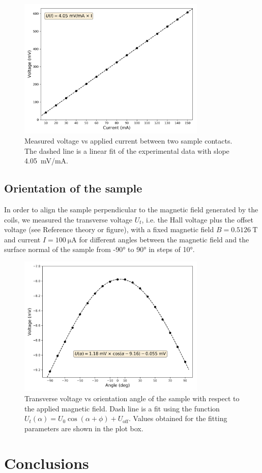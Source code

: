 \documentclass[11pt,a4paper]{article}
\begin{document}
\begin{figure}[ht]
\centering
\includegraphics[width=0.8\textwidth]{Voltage_vs_current_ohmic_test}
\caption{Measured voltage vs applied current between two sample contacts. The dashed line is a linear fit of the experimental data with slope \SI{4.05}{\milli\volt/\milli\ampere}.}
\label{fig:ohmic_check}
\end{figure}

\subsection{Orientation of the sample}

In order to align the sample perpendicular to the magnetic field generated by the coils, we measured the transverse voltage $U_t$, i.e. the Hall voltage plus the offset voltage (see {\color{red}Reference theory or figure}), with a fixed magnetic field $B=\SI{0.5126}{\tesla}$ and current $I=\SI{100}{\micro\ampere}$ for different angles between the magnetic field and the surface normal of the sample from \ang{-90} to \ang{90} in steps of \ang{10}.

\begin{figure}[ht]
\centering
\includegraphics[width=0.8\textwidth]{Voltage_vs_angle}
\caption{Transverse voltage vs orientation angle of the sample with respect to the applied magnetic field. Dash line is a fit using the function $U_t(\alpha)=U_0\cos(\alpha+\phi) + U_\text{off}$. Values obtained for the fitting parameters are shown in the plot box.}
\label{fig:orientation}
\end{figure}

\section{Conclusions}

%
%

\begin{appendices}


\end{appendices}
\end{document}
